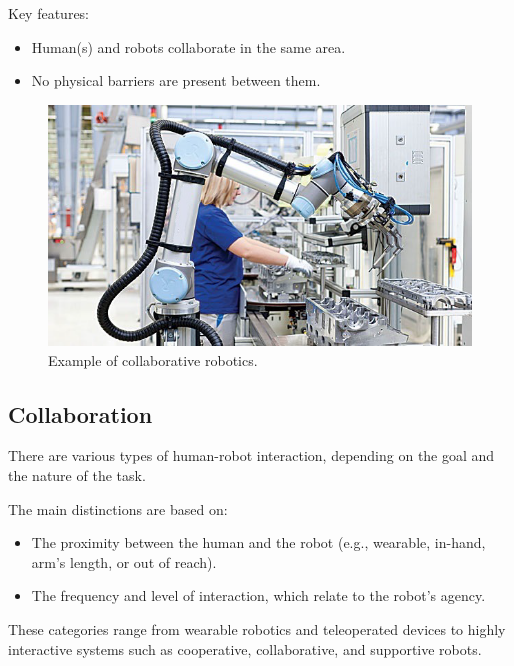 Key features:
\begin{itemize}
  \item Human(s) and robots collaborate in the same area.
  \item No physical barriers are present between them.
\end{itemize}

\hfill
\begin{figure}[H]
    \centering
    \includegraphics[width=0.6\linewidth]{imgs/collaborative_robotics_example.png}
    \caption{Example of collaborative robotics.}
\end{figure}

\hfill

\subsection{Collaboration}

There are various types of human-robot interaction, depending on the goal and the nature of the task.

The main distinctions are based on:
\begin{itemize}
  \item The proximity between the human and the robot (e.g., wearable, in-hand, arm's length, or out of reach).
  \item The frequency and level of interaction, which relate to the robot's agency.
\end{itemize}

These categories range from wearable robotics and teleoperated devices to highly interactive systems such as cooperative, collaborative, and supportive robots.

